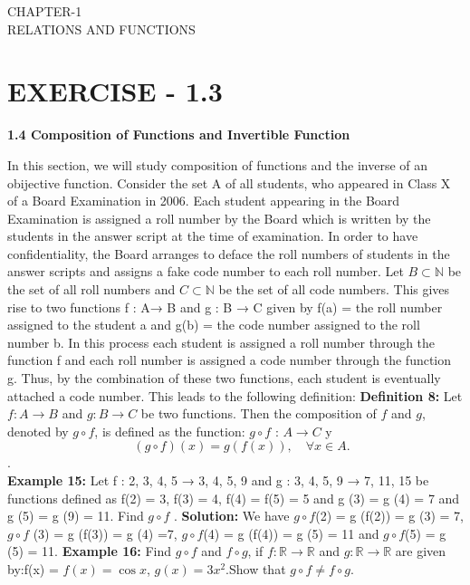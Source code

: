 \documentclass[12pt]{article}
\begin{document}
\begin{center}
\textbf\large{CHAPTER-1 \\  RELATIONS AND FUNCTIONS}
\end{center}
 
\section*{EXERCISE - 1.3}
\textbf{1.4 Composition of Functions and Invertible Function}

In this section, we will study composition of functions and the inverse of an obijective function. Consider the set A of all students, who appeared in Class X of a Board Examination in 2006. Each student appearing in the Board Examination is assigned a roll number by the Board which is written by the students in the answer script at the time of examination. In order to have confidentiality, the Board arranges to deface the roll numbers of students in the answer scripts and assigns a fake code number to each roll number. Let \( B \subset \mathbb{N} \) be the set of all roll numbers and \( C \subset \mathbb{N} \) be the set of all code numbers. This gives rise to two functions f : A→ B and g : B → C given by f(a) = the roll number assigned to the student a and g(b) = the code number assigned to the roll number b. In this process each student is assigned a roll number through the function f and each roll number is assigned a code number through the function g. Thus, by the combination of these two functions, each student is eventually attached a code number.
This leads to the following definition: \newline
\textbf{Definition 8:} Let \( f: A \to B \) and \( g: B \to C \) be two functions. Then the composition of \( f \) and \( g \), denoted by \( g \circ f \), is defined as the function:
\( g \circ f \) : \( A \to C \)  y
\[\quad (g \circ f)(x) = g(f(x)), \quad \forall x \in A.
\]. 
\\
\textbf{Example 15:} Let f : {2, 3, 4, 5} → {3, 4, 5, 9} and g : {3, 4, 5, 9} → {7, 11, 15} be functions defined as f(2) = 3, f(3) = 4, f(4) = f(5) = 5 and g (3) = g (4) = 7 and g (5) = g (9) = 11. Find \( g \circ f \) .\newline
\textbf{Solution:} We have \( g \circ f \)(2) = g (f(2)) = g (3) = 7, \( g \circ f \) (3) = g (f(3)) = g (4) =7,
\( g \circ f \)(4) = g (f(4)) = g (5) = 11 and \( g \circ f \)(5) = g (5) = 11.\newline
\textbf{Example 16:}  
Find \( g \circ f \) and \( f \circ g \), if \( f: \mathbb{R} \to \mathbb{R} \) and \( g: \mathbb{R} \to \mathbb{R} \) are given by:f(x) = \( f(x) = \cos x \), \( g(x) = 3x^2 \).Show that \( g \circ f \neq f \circ g \).\newline
\end{document}
